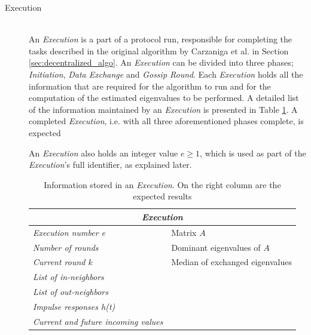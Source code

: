 \documentclass[a4paper,11pt,twoside]{report}
\begin{document}
\begin{description}
  \item[Execution] \hfill \\
  An \textit{Execution} is a part of a protocol run, responsible for completing the tasks described in the original algorithm by Carzaniga et al. in Section \ref{sec:decentralized_algo}. An \textit{Execution} can be divided into three phases; \textit{Initiation}, \textit{Data Exchange} and \textit{Gossip Round}. Each \textit{Execution} holds all the information that are required for the algorithm to run and for the computation of the estimated eigenvalues to be performed. A detailed list of the information maintained by an \textit{Execution} is presented in Table \ref{table:execution_fields}. A completed \textit{Execution}, i.e. with all three aforementioned phases complete, is expected 
  An \textit{Execution} also holds an integer value $e \ge 1$, which is used as part of the \textit{Execution}'s full identifier, as explained later. 
  
  \begin{table}
  \centering
	\begin{tabular}{|l|l|}
	\hline
	\multicolumn{2}{|c|}{\textbf{\textit{Execution}}}\\
	\hline
	\hline
	\textit{Execution number e} & Matrix $A$\\
   	\textit{Number of rounds} & Dominant eigenvalues of $A$\\
   	\textit{Current round $k$} & Median of exchanged eigenvalues\\
    \textit{List of in-neighbors} & \\
    \textit{List of out-neighbors} &\\
    \textit{Impulse responses h(t)} &\\
    \textit{Current and future incoming values} &\\
    \hline
  	\end{tabular}
  	\caption{Information stored in an \textit{Execution}. On the right column are the expected results}
  	\label{table:execution_fields}
  \end{table}
  

\end{description}
\end{document}
